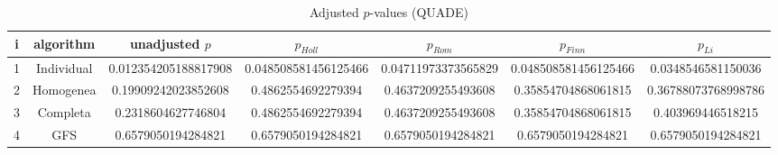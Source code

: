\documentclass[a4paper,10pt]{article}
\begin{document}
\begin{landscape}
\begin{table}[!htp]
\centering\scriptsize
\caption{Adjusted $p$-values (QUADE)}
\begin{tabular}{ccccccc}
i&algorithm&unadjusted $p$&$p_{Holl}$&$p_{Rom}$&$p_{Finn}$&$p_{Li}$\\
\hline
1&Individual&0.012354205188817908&0.048508581456125466&0.04711973373565829&0.048508581456125466&0.0348546581150036\\
2&Homogenea&0.19909242023852608&0.4862554692279394&0.4637209255493608&0.35854704868061815&0.36788073768998786\\
3&Completa&0.2318604627746804&0.4862554692279394&0.4637209255493608&0.35854704868061815&0.403969446518215\\
4&GFS&0.6579050194284821&0.6579050194284821&0.6579050194284821&0.6579050194284821&0.6579050194284821\\
\hline
\end{tabular}
\end{table}

\end{landscape}
\end{document}
